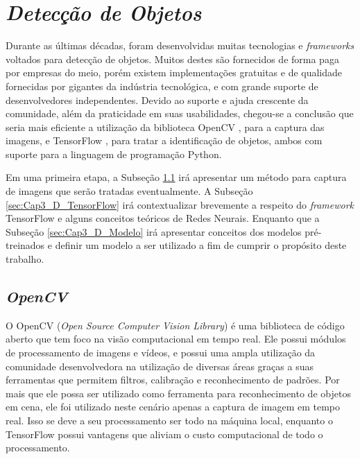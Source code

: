 \section{\textit{Detecção de Objetos}}\label{sec:Cap3_Deteccao}

Durante as últimas décadas, foram desenvolvidas muitas tecnologias e \textit{frameworks} voltados para detecção de objetos. Muitos destes são fornecidos de forma paga por empresas do meio, porém existem implementações gratuitas e de qualidade fornecidas por gigantes da indústria tecnológica, e com grande suporte de desenvolvedores independentes. Devido ao suporte e ajuda crescente da comunidade, além da praticidade em suas usabilidades, chegou-se a conclusão que seria mais eficiente a utilização da biblioteca OpenCV \cite{howse2013opencv}, para a captura das imagens, e TensorFlow \cite{tensorFlow}, para tratar a identificação de objetos, ambos com suporte para a linguagem de programação Python.

Em uma primeira etapa, a Subseção \ref{sec:Cap3_D_OpenCV} irá apresentar um método para captura de imagens que serão tratadas eventualmente. A Subseção \ref{sec:Cap3_D_TensorFlow} irá contextualizar brevemente a respeito do \textit{framework} TensorFlow e alguns conceitos teóricos de Redes Neurais. Enquanto que a Subseção \ref{sec:Cap3_D_Modelo} irá apresentar conceitos dos modelos pré-treinados e definir um modelo a ser utilizado a fim de cumprir o propósito deste trabalho.
 
\subsection{\textit{OpenCV}}\label{sec:Cap3_D_OpenCV}
 
O OpenCV (\textit{Open Source Computer Vision Library}) é uma biblioteca de código aberto que tem foco na visão computacional em tempo real. Ele possui módulos de processamento de imagens e vídeos, e possui uma ampla utilização da comunidade desenvolvedora na utilização de diversas áreas graças a suas ferramentas que permitem filtros, calibração e reconhecimento de padrões. Por mais que ele possa ser utilizado como ferramenta para reconhecimento de objetos em cena, ele foi utilizado neste cenário apenas a captura de imagem em tempo real. Isso se deve a seu processamento ser todo na máquina local, enquanto o TensorFlow possui vantagens que aliviam o custo computacional de todo o processamento.

